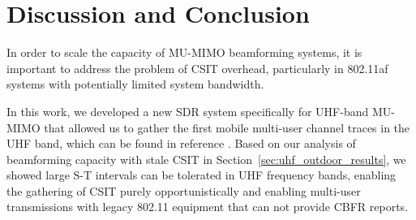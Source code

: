 %
%
%
 
\section{Discussion and Conclusion}
\label{sec_protocol_conclusion}
 
 In order to scale the capacity of \ac{MU-MIMO} beamforming systems, it is important to address the problem of \ac{CSIT} overhead, particularly in 802.11af systems with potentially limited system bandwidth.

 In this work, we developed a new \ac{SDR} system specifically for UHF-band \ac{MU-MIMO} that allowed us to gather the first mobile multi-user channel traces in the UHF band, which can be found in reference \cite{shepard2016understanding}.
	Based on our analysis of beamforming capacity with stale \ac{CSIT} in Section~\ref{sec:uhf_outdoor_results}, we showed large S-T intervals can be tolerated in UHF frequency bands, enabling the gathering of \ac{CSIT} purely opportunistically and enabling multi-user transmissions with legacy 802.11 equipment that can not provide \ac{CBFR} reports.

